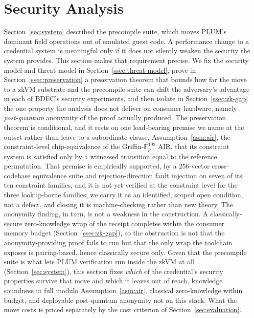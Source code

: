 \section{Security Analysis}\label{sec:security}
Section~\ref{sec:system} described the precompile suite, which moves PLUM's dominant field operations out of emulated guest code. A performance change to a credential system is meaningful only if it does not silently weaken the security the system provides. This section makes that requirement precise. We fix the security model and threat model in Section~\ref{ssec:threat-model}, prove in Section~\ref{ssec:preservation} a preservation theorem that bounds how far the move to a zkVM substrate and the precompile suite can shift the adversary's advantage in each of BDEC's security experiments, and then isolate in Section~\ref{ssec:zk-gap} the one property the analysis does not deliver on consumer hardware, namely \emph{post-quantum} anonymity of the proof actually produced. The preservation theorem is conditional, and it rests on one load-bearing premise we name at the outset rather than leave to a subordinate clause, Assumption~\ref{asm:air}, the constraint-level chip-equivalence of the Griffin-$\mathbb{F}_p^{192}$ AIR, that its constraint system is satisfied only by a witnessed transition equal to the reference permutation. That premise is empirically supported, by a $256$-vector cross-codebase equivalence suite and rejection-direction fault injection on seven of its ten constraint families, and it is not yet verified at the constraint level for the three lookup-borne families; we carry it as an identified, scoped open condition, not a defect, and closing it is machine-checking rather than new theory. The anonymity finding, in turn, is not a weakness in the construction. A classically-secure zero-knowledge wrap of the receipt completes within the consumer memory budget (Section~\ref{ssec:zk-gap}), so the obstruction is not that the anonymity-providing proof fails to run but that the only wrap the toolchain exposes is pairing-based, hence classically secure only. Given that the precompile suite is what lets PLUM verification run inside the zkVM at all (Section~\ref{sec:system}), this section fixes \emph{which} of the credential's security properties survive that move and which it leaves out of reach, knowledge soundness in full modulo Assumption~\ref{asm:air}, classical zero-knowledge within budget, and deployable post-quantum anonymity not on this stack. What the move costs is priced separately by the cost criterion of Section~\ref{sec:evaluation}.


